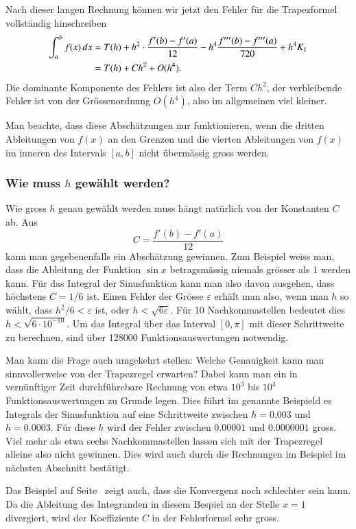 Nach dieser langen Rechnung können wir jetzt den Fehler für die
Trapezformel vollständig hinschreiben
\begin{align}
\int_a^b f(x)\,dx
&=
T(h) + h^2 \cdot \frac{f'(b)-f'(a)}{12} - h^4 \frac{f'''(b)-f'''(a)}{720}
+h^4 K_1
\notag
\\
&=
T(h) + Ch^2 + O(h^4).
\label{buch:equation:trapezfehler}
\end{align}
Die dominante Komponente des Fehlers ist also der Term $Ch^2$, 
der verbleibende Fehler ist von der Grössenordnung $O(h^4)$, also
im allgemeinen viel kleiner.

Man beachte, dass diese Abschätzungen nur funktionieren, wenn die
dritten Ableitungen von $f(x)$ an den Grenzen und die vierten Ableitungen
von $f(x)$ im inneren des Intervals $[a,b]$ nicht übermässig gross werden.

\subsubsection{Wie muss $h$ gewählt werden?}
Wie gross $h$ genau gewählt werden muss hängt natürlich von der Konstanten
$C$ ab.
Aus
\[
C=\frac{f'(b)-f'(a)}{12}
\]
kann man gegebenenfalls ein Abschätzung gewinnen.
Zum Beispiel weiss man, dass die Ableitung der Funktion $\sin x$
betragsmässig niemals grösser als $1$ werden kann.
Für das Integral der Sinusfunktion kann man also davon ausgehen, dass
höchstens $C=1/6$ ist.
Einen Fehler der Grösse $\varepsilon$ erhält man also, wenn man $h$ so wählt,
dass $h^2/6 < \varepsilon$ ist, oder $h<\sqrt{6\varepsilon}$.
Für 10 Nachkommastellen bedeutet dies $h < \sqrt{6\cdot10^{-10}}$.
Um das Integral über das Interval $[0,\pi]$ mit dieser Schrittweite
zu berechnen, sind über 128000 Funktionsauswertungen notwendig.

Man kann die Frage auch umgekehrt stellen: Welche Genauigkeit kann man
sinnvollerweise von der Trapezregel erwarten?
Dabei kann man ein in vernünftiger Zeit durchführebare Rechnung von
etwa $10^3$ bis $10^4$ Funktionsauswertungen zu Grunde legen.
Dies führt im genannte Beispield es Integrals der Sinusfunktion auf
eine Schrittweite zwischen $h=0.003$ und $h=0.0003$.
Für diese $h$ wird der Fehler zwischen $0.00001$ und $0.0000001$ gross.
Viel mehr als etwa sechs Nachkommastellen lassen sich mit der Trapezregel
alleine also nicht gewinnen.
Dies wird auch durch die Rechnungen im Beispiel im nächsten Abschnitt
bestätigt.

Das Beispiel auf Seite~\pageref{buch:beispiel:kreis} zeigt auch, dass
die Konvergenz noch schlechter sein kann.
Da die Ableitung des Integranden in diesem Bespiel an der Stelle $x=1$
divergiert, wird der Koeffiziente $C$ in der Fehlerformel sehr gross.


